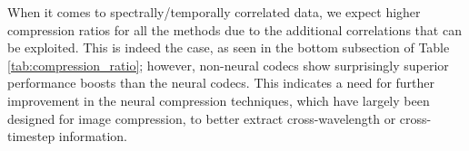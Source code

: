 When it comes to spectrally/temporally correlated data, we expect higher compression ratios for all the methods due to the additional correlations that can be exploited. This is indeed the case, as seen in the bottom subsection of Table \ref{tab:compression_ratio}; however, non-neural codecs show surprisingly superior performance boosts than the neural codecs.
This indicates a need for further improvement in the neural compression techniques, which have largely been designed for image compression, to better extract cross-wavelength or cross-timestep information.



